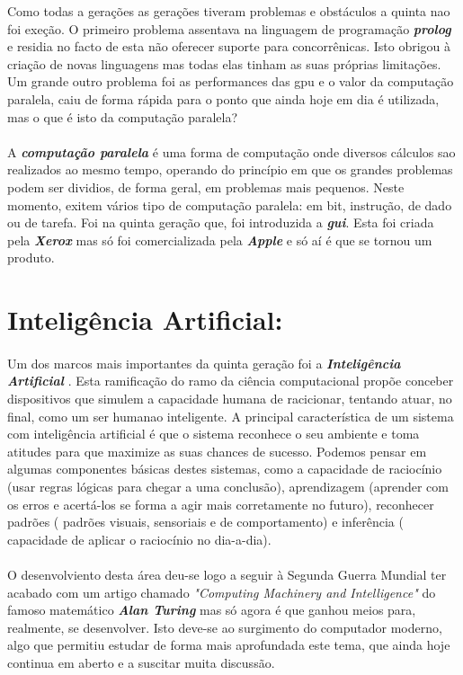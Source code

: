 \documentclass{report}
\begin{document}
Como todas a gerações as gerações tiveram problemas e obstáculos a quinta nao foi exeção. O primeiro problema assentava na linguagem de programação \textbf{\textit{prolog}} e residia no facto de esta não oferecer suporte para concorrênicas. Isto obrigou à criação de novas linguagens mas todas elas tinham as suas próprias limitações. Um grande outro problema foi as performances das \acs{gpu} e o valor da computação paralela, caiu de forma rápida para o ponto que ainda hoje em dia é utilizada, mas o que é isto da computação paralela? 
\paragraph{} 
A \textbf{\textit{computação paralela}} \cite{computacaoparalela} é uma forma de computação onde diversos cálculos sao realizados ao mesmo tempo, operando do princípio em que os grandes problemas podem ser dividios, de forma geral, em problemas mais pequenos. Neste momento, exitem vários tipo de computação paralela: em bit, instrução, de dado ou de tarefa.
Foi na quinta geração que, foi introduzida a \textbf{\textit{\acs{gui}}}. Esta foi criada pela \textbf{\textit{Xerox}} mas só foi comercializada pela \textbf{\textit{Apple}} e só aí é que se tornou um produto.	
			
\section{Inteligência Artificial:}		
\paragraph{}	
Um dos marcos mais importantes da quinta geração foi a \textbf{\textit{Inteligência Artificial}} \cite{artificial}. Esta ramificação do ramo da ciência computacional propõe conceber dispositivos que simulem a capacidade humana de racicionar, tentando atuar, no final, como um ser humanao inteligente. A principal característica de um sistema com inteligência artificial é que o sistema reconhece o seu ambiente e toma atitudes para que maximize as suas chances de sucesso. Podemos pensar em algumas componentes básicas destes sistemas, como a capacidade de raciocínio (usar regras lógicas para chegar a uma conclusão), aprendizagem (aprender com os erros e acertá-los se forma a agir mais corretamente no futuro), reconhecer padrões ( padrões visuais, sensoriais e de comportamento) e inferência ( capacidade de aplicar o raciocínio no dia-a-dia).
\paragraph{}
O desenvolviento desta área deu-se logo a seguir à Segunda Guerra Mundial ter acabado com um artigo chamado \textit{"Computing Machinery and Intelligence"} do famoso matemático \textbf{\textit{Alan Turing}} mas só agora é que  ganhou meios para, realmente, se desenvolver. Isto deve-se ao surgimento do computador moderno, algo que permitiu estudar de forma mais aprofundada este tema, que ainda hoje continua em aberto e a suscitar muita discussão.
\end{document}
